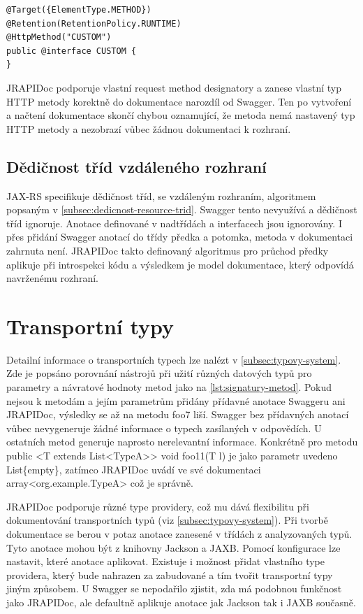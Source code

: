 \documentclass[11pt,twoside,a4paper]{book}
\begin{document}
\begin{lstlisting}[frame=single, caption={Vlastní request method
designator},label={lst:vlastni-designator}] 
@Target({ElementType.METHOD})
@Retention(RetentionPolicy.RUNTIME)
@HttpMethod("CUSTOM")
public @interface CUSTOM {
}
\end{lstlisting}

JRAPIDoc podporuje vlastní request method designatory a zanese vlastní typ HTTP
metody korektně do dokumentace narozdíl od Swagger. Ten po vytvoření a načtení
dokumentace skončí chybou oznamující, že metoda nemá nastavený typ HTTP metody a
nezobrazí vůbec žádnou dokumentaci k rozhraní.

\subsection{Dědičnost tříd vzdáleného rozhraní}

JAX-RS specifikuje dědičnost tříd, se vzdáleným rozhraním, algoritmem popsaným v
\ref{subsec:dedicnost-resource-trid}. Swagger tento nevyužívá a dědičnost tříd
ignoruje. Anotace definované v nadtřídách a interfacech jsou ignorovány. I přes
přidání Swagger anotací do třídy předka a potomka, metoda v dokumentaci zahrnuta
není. JRAPIDoc takto definovaný algoritmus pro průchod předky aplikuje při
introspekci kódu a výsledkem je model dokumentace, který odpovídá navrženému rozhraní.

\section{Transportní typy}

Detailní informace o transportních typech lze nalézt v
\ref{subsec:typovy-system}.
Zde je popsáno porovnání nástrojů při užití různých datových typů pro
parametry a návratové hodnoty metod jako na \ref{lst:signatury-metod}. Pokud nejsou k
metodám a jejím parametrům přidány přídavné anotace Swaggeru ani JRAPIDoc,
výsledky se až na metodu foo7 liší. Swagger bez přídavných anotací vůbec
nevygeneruje žádné informace o typech zasílaných v odpovědích. U ostatních metod generuje
naprosto nerelevantní informace. Konkrétně pro metodu 
public <T extends List<TypeA>> void foo11(T l) je jako parametr uvedeno
List\{empty\}, zatímco JRAPIDoc uvádí ve své dokumentaci
array<org.example.TypeA> což je správně.

JRAPIDoc podporuje různé type providery, což mu dává flexibilitu při
dokumentování transportních typů (viz \ref{subsec:typovy-system}). Při tvorbě
dokumentace se berou v potaz anotace zanesené v třídách z analyzovaných typů. Tyto anotace mohou být z
knihovny Jackson a JAXB. Pomocí konfigurace lze nastavit, které anotace
aplikovat. Existuje i možnost přidat vlastního type providera, který bude
nahrazen za zabudované a tím tvořit transportní typy jiným způsobem. 
U Swagger se nepodařilo zjistit, zda má podobnou funkčnost jako JRAPIDoc, ale
defaultně aplikuje anotace jak Jackson tak i JAXB současně.
\end{document}
